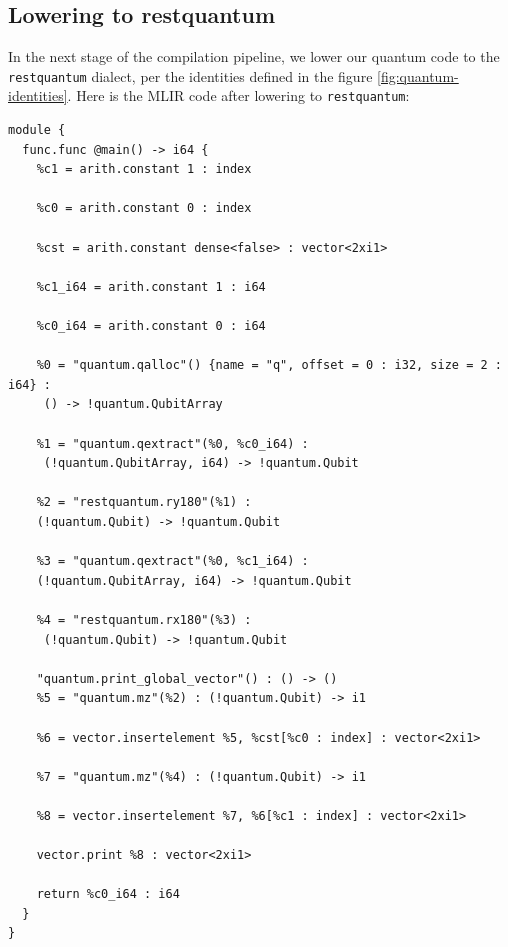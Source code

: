 \subsection{Lowering to restquantum}
In the next stage of the compilation pipeline, we lower our quantum code to the \texttt{restquantum} dialect,
per the identities defined in the figure \ref{fig:quantum-identities}.
Here is the MLIR code after lowering to \texttt{restquantum}:
\begin{verbatim}
module {
  func.func @main() -> i64 {
    %c1 = arith.constant 1 : index

    %c0 = arith.constant 0 : index

    %cst = arith.constant dense<false> : vector<2xi1>

    %c1_i64 = arith.constant 1 : i64

    %c0_i64 = arith.constant 0 : i64
    
    %0 = "quantum.qalloc"() {name = "q", offset = 0 : i32, size = 2 : i64} :
     () -> !quantum.QubitArray

    %1 = "quantum.qextract"(%0, %c0_i64) :
     (!quantum.QubitArray, i64) -> !quantum.Qubit

    %2 = "restquantum.ry180"(%1) : 
    (!quantum.Qubit) -> !quantum.Qubit

    %3 = "quantum.qextract"(%0, %c1_i64) : 
    (!quantum.QubitArray, i64) -> !quantum.Qubit

    %4 = "restquantum.rx180"(%3) :
     (!quantum.Qubit) -> !quantum.Qubit

    "quantum.print_global_vector"() : () -> ()
    %5 = "quantum.mz"(%2) : (!quantum.Qubit) -> i1

    %6 = vector.insertelement %5, %cst[%c0 : index] : vector<2xi1>
    
    %7 = "quantum.mz"(%4) : (!quantum.Qubit) -> i1

    %8 = vector.insertelement %7, %6[%c1 : index] : vector<2xi1>

    vector.print %8 : vector<2xi1>

    return %c0_i64 : i64
  }
}
\end{verbatim}

